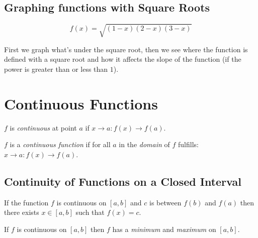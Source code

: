 \documentclass[00_complete]{subfiles}
\begin{document}
\subsection{Graphing functions with Square Roots}

$$f(x)=\sqrt{(1-x)(2-x)(3-x)}$$

First we graph what's under the square root, then we see where the function is
defined with a square root and how it affects the slope of the function (if the
power is greater than or less than $1$).

\section{Continuous Functions}

$f$ is \emph{continuous} at point $a$ if $x \to a: f(x) \to f(a)$.

$f$ is a \emph{continuous function} if for all $a$ in the \emph{domain} of $f$ fulfills: $x \to a: f(x) \to f(a)$.

\subsection{Continuity of Functions on a Closed Interval}

\begin{theorem}
If the function $f$ is continuous on $[a,b]$ and $c$ is between $f(b)$ and
$f(a)$ then there exists $x \in [a,b]$ such that $f(x) = c$.
\end{theorem}

\begin{theorem}
If $f$ is continuous on $[a,b]$ then $f$ has a \emph{minimum} and
\emph{maximum} on $[a,b]$.
\end{theorem}
\end{document}
